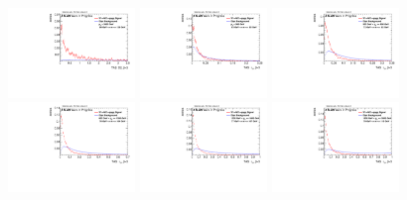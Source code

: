 \begin{figure}[H]
\includegraphics[width=0.3\textwidth]{sascha_input/Appendix/Distributions/w/distributions/beta3/h_assisted_tj_D2_3_bin6.pdf}
\bigskip 
\includegraphics[width=0.3\textwidth]{sascha_input/Appendix/Distributions/w/distributions/beta3/h_assisted_tj_nSub21_3_bin1.pdf} \hspace{1mm}
\includegraphics[width=0.3\textwidth]{sascha_input/Appendix/Distributions/w/distributions/beta3/h_assisted_tj_nSub21_3_bin2.pdf} \hspace{1mm}
\includegraphics[width=0.3\textwidth]{sascha_input/Appendix/Distributions/w/distributions/beta3/h_assisted_tj_nSub21_3_bin3.pdf} 
\bigskip
\includegraphics[width=0.3\textwidth]{sascha_input/Appendix/Distributions/w/distributions/beta3/h_assisted_tj_nSub21_3_bin4.pdf} \hspace{6mm}
\includegraphics[width=0.3\textwidth]{sascha_input/Appendix/Distributions/w/distributions/beta3/h_assisted_tj_nSub21_3_bin5.pdf} \hspace{6mm}

\end{figure}
